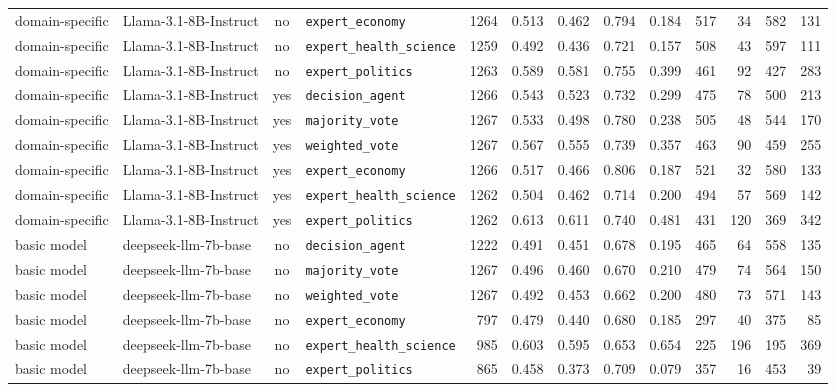 \begin{landscape}
\begin{longtable}{@{}l p{3.2cm} c l r r r r r r r r r@{}}
domain-specific & Llama-3.1-8B-Instruct & no & \texttt{expert\_economy} & 1264 & 0.513 & 0.462 & 0.794 & 0.184 & 517 & 34 & 582 & 131\\
domain-specific & Llama-3.1-8B-Instruct & no & \texttt{expert\_health\_science} & 1259 & 0.492 & 0.436 & 0.721 & 0.157 & 508 & 43 & 597 & 111\\
domain-specific & Llama-3.1-8B-Instruct & no & \texttt{expert\_politics} & 1263 & 0.589 & 0.581 & 0.755 & 0.399 & 461 & 92 & 427 & 283\\
domain-specific & Llama-3.1-8B-Instruct & yes & \texttt{decision\_agent} & 1266 & 0.543 & 0.523 & 0.732 & 0.299 & 475 & 78 & 500 & 213\\
domain-specific & Llama-3.1-8B-Instruct & yes & \texttt{majority\_vote} & 1267 & 0.533 & 0.498 & 0.780 & 0.238 & 505 & 48 & 544 & 170\\
domain-specific & Llama-3.1-8B-Instruct & yes & \texttt{weighted\_vote} & 1267 & 0.567 & 0.555 & 0.739 & 0.357 & 463 & 90 & 459 & 255\\
domain-specific & Llama-3.1-8B-Instruct & yes & \texttt{expert\_economy} & 1266 & 0.517 & 0.466 & 0.806 & 0.187 & 521 & 32 & 580 & 133\\
domain-specific & Llama-3.1-8B-Instruct & yes & \texttt{expert\_health\_science} & 1262 & 0.504 & 0.462 & 0.714 & 0.200 & 494 & 57 & 569 & 142\\
domain-specific & Llama-3.1-8B-Instruct & yes & \texttt{expert\_politics} & 1262 & 0.613 & 0.611 & 0.740 & 0.481 & 431 & 120 & 369 & 342\\
\midrule
basic model & deepseek-llm-7b-base & no & \texttt{decision\_agent} & 1222 & 0.491 & 0.451 & 0.678 & 0.195 & 465 & 64 & 558 & 135\\
basic model & deepseek-llm-7b-base & no & \texttt{majority\_vote} & 1267 & 0.496 & 0.460 & 0.670 & 0.210 & 479 & 74 & 564 & 150\\
basic model & deepseek-llm-7b-base & no & \texttt{weighted\_vote} & 1267 & 0.492 & 0.453 & 0.662 & 0.200 & 480 & 73 & 571 & 143\\
basic model & deepseek-llm-7b-base & no & \texttt{expert\_economy} & 797 & 0.479 & 0.440 & 0.680 & 0.185 & 297 & 40 & 375 & 85\\
basic model & deepseek-llm-7b-base & no & \texttt{expert\_health\_science} & 985 & 0.603 & 0.595 & 0.653 & 0.654 & 225 & 196 & 195 & 369\\
basic model & deepseek-llm-7b-base & no & \texttt{expert\_politics} & 865 & 0.458 & 0.373 & 0.709 & 0.079 & 357 & 16 & 453 & 39\\

\end{longtable}
\end{landscape}
